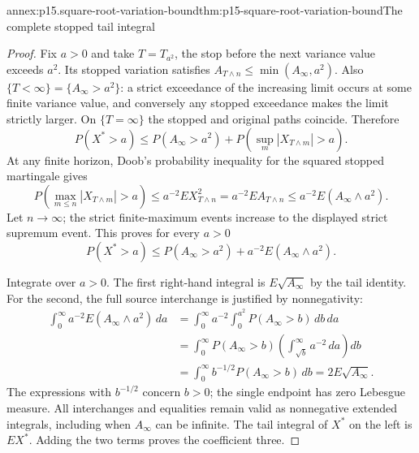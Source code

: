 \begin{annexitem}{annex:p15.square-root-variation-bound}{thm:p15-square-root-variation-bound}{The complete stopped tail integral}
\begin{proof}
Fix \(a>0\) and take \(T=T_{a^2}\), the stop before the next
variance value exceeds \(a^2\).
Its stopped variation satisfies
\(A_{T\wedge n}\leq\min(A_\infty,a^2)\).
Also \(\{T<\infty\}=\{A_\infty>a^2\}\):
a strict exceedance of the increasing limit occurs at some
finite variance value, and conversely any stopped exceedance
makes the limit strictly larger.
On \(\{T=\infty\}\) the stopped and original paths coincide.
Therefore
\[
 P(X^*>a)\leq P(A_\infty>a^2)
                       +P\left(\sup_m|X_{T\wedge m}|>a\right).
\]
At any finite horizon, Doob's probability inequality for the
squared stopped martingale gives
\[
 P\left(\max_{m\leq n}|X_{T\wedge m}|>a\right)
      \leq a^{-2}EX_{T\wedge n}^2
      =a^{-2}EA_{T\wedge n}
      \leq a^{-2}E(A_\infty\wedge a^2).
\]
Let \(n\to\infty\); the strict finite-maximum events increase
to the displayed strict supremum event.
This proves for every \(a>0\)
\[
              P(X^*>a)\leq P(A_\infty>a^2)
                                      +a^{-2}E(A_\infty\wedge a^2).
\]

Integrate over \(a>0\). The first right-hand integral is
\(E\sqrt{A_\infty}\) by the tail identity.
For the second, the full source interchange is justified by
nonnegativity:
\[
 \begin{aligned}
 \int_0^\infty a^{-2}E(A_\infty\wedge a^2)\,da
   &=\int_0^\infty a^{-2}\int_0^{a^2}P(A_\infty>b)\,db\,da\\
   &=\int_0^\infty P(A_\infty>b)
                       \left(\int_{\sqrt b}^\infty a^{-2}\,da\right)db\\
   &=\int_0^\infty b^{-1/2}P(A_\infty>b)\,db
     =2E\sqrt{A_\infty}.
 \end{aligned}
\]
The expressions with \(b^{-1/2}\) concern \(b>0\);
the single endpoint has zero Lebesgue measure.
All interchanges and equalities remain valid as nonnegative
extended integrals, including when \(A_\infty\) can be infinite.
The tail integral of \(X^*\) on the left is \(EX^*\).
Adding the two terms proves the coefficient three.
\end{proof}
\end{annexitem}

